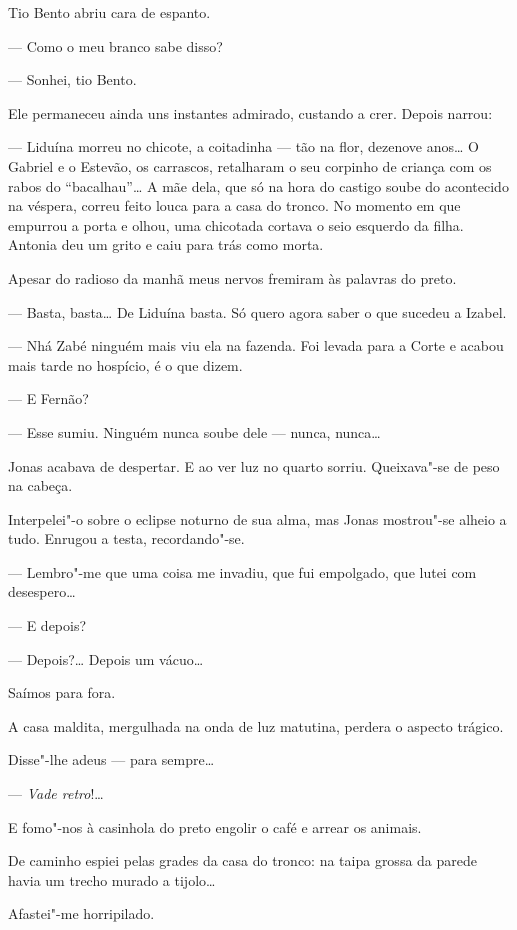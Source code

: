 Tio Bento abriu cara de espanto.

--- Como o meu branco sabe disso?

--- Sonhei, tio Bento.

Ele permaneceu ainda uns instantes admirado, custando a crer. Depois
narrou:

--- Liduína morreu no chicote, a coitadinha --- tão na flor, dezenove
anos\ldots{} O Gabriel e o Estevão, os carrascos, retalharam o seu corpinho
de criança com os rabos do ``bacalhau''\ldots{} A mãe dela, que só na hora do
castigo soube do acontecido na véspera, correu feito louca para a casa
do tronco. No momento em que empurrou a porta e olhou, uma chicotada
cortava o seio esquerdo da filha. Antonia deu um grito e caiu para trás
como morta.

Apesar do radioso da manhã meus nervos fremiram às palavras do preto.

--- Basta, basta\ldots{} De Liduína basta. Só quero agora saber o que sucedeu
a Izabel.

--- Nhá Zabé ninguém mais viu ela na fazenda. Foi levada para a Corte e
acabou mais tarde no hospício, é o que dizem.

--- E Fernão?

--- Esse sumiu. Ninguém nunca soube dele --- nunca, nunca\ldots{}

Jonas acabava de despertar. E ao ver luz no quarto sorriu. Queixava"-se
de peso na cabeça.

Interpelei"-o sobre o eclipse noturno de sua alma, mas Jonas mostrou"-se
alheio a tudo. Enrugou a testa, recordando"-se.

--- Lembro"-me que uma coisa me invadiu, que fui empolgado, que lutei com
desespero\ldots{}

--- E depois?

--- Depois?\ldots{} Depois um vácuo\ldots{}

Saímos para fora.

A casa maldita, mergulhada na onda de luz matutina, perdera o aspecto
trágico.

Disse"-lhe adeus --- para sempre\ldots{}

--- \emph{Vade retro}!\ldots{}

E fomo"-nos à casinhola do preto engolir o café e arrear os animais.

De caminho espiei pelas grades da casa do tronco: na taipa grossa da
parede havia um trecho murado a tijolo\ldots{}

Afastei"-me horripilado.

